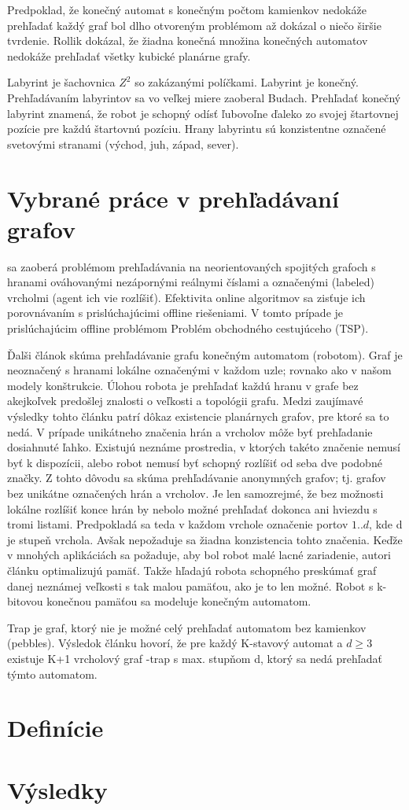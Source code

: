 Predpoklad, že konečný automat s konečným počtom 
kamienkov nedokáže prehľadať každý graf bol dlho otvoreným problémom až
\cite{ROLL} dokázal o niečo širšie tvrdenie. Rollik \cite{ROLL} dokázal, 
že žiadna konečná množina konečných automatov nedokáže prehľadať všetky 
kubické planárne grafy.

Labyrint je šachovnica $Z^2$ so zakázanými políčkami. 
Labyrint je konečný. Prehľadávaním labyrintov sa vo veľkej miere zaoberal 
Budach.
Prehľadať konečný labyrint znamená, že robot je schopný odísť ľubovoľne 
ďaleko zo svojej štartovnej pozície pre každú štartovnú pozíciu. 
Hrany labyrintu sú konzistentne označené svetovými stranami (východ, juh, 
západ, sever).

\section{Vybrané práce v prehľadávaní grafov}
\cite{OGE} sa zaoberá problémom prehľadávania na neorientovaných 
spojitých grafoch s hranami ováhovanými nezápornými reálnymi číslami a 
označenými (labeled) vrcholmi (agent ich vie rozlíšiť).
Efektivita online algoritmov sa zisťuje ich porovnávaním s  prislúchajúcimi 
offline riešeniami. V tomto prípade je prislúchajúcim offline problémom
Problém obchodného cestujúceho (TSP).

Ďalši článok \cite{GEFA}
skúma prehľadávanie grafu konečným automatom (robotom). 
Graf je neoznačený s hranami lokálne označenými v každom uzle; rovnako ako v
našom modely konštrukcie.
Úlohou robota je prehľadať každú hranu v grafe bez akejkoľvek predošlej 
znalosti o veľkosti a topológii grafu. Medzi zaujímavé výsledky tohto článku 
patrí dôkaz existencie planárnych grafov, pre ktoré sa to nedá.
V prípade unikátneho značenia hrán a vrcholov môže byť prehľadanie 
dosiahnuté ľahko. Existujú neznáme prostredia, v ktorých takéto značenie 
nemusí byť k dispozícii, alebo robot nemusí byť schopný rozlíšiť od seba dve 
podobné značky. Z tohto dôvodu sa skúma prehľadávanie anonymných grafov; 
tj. grafov bez unikátne označených hrán a vrcholov.
Je len samozrejmé, že bez možnosti lokálne rozlíšiť konce hrán by nebolo možné 
prehľadať dokonca ani hviezdu s tromi listami.
Predpokladá sa teda v každom vrchole označenie portov $1 .. d$, kde d je 
stupeň vrchola. Avšak nepožaduje sa žiadna konzistencia tohto značenia. 
Keďže v mnohých aplikáciách sa požaduje, aby bol robot malé lacné zariadenie, 
autori článku optimalizujú pamäť. Takže hľadajú robota schopného preskúmať 
graf danej neznámej veľkosti s tak malou pamäťou, ako je to len možné. 
Robot s k-bitovou konečnou pamäťou sa modeluje konečným automatom. 




Trap je graf, ktorý nie je možné 
celý prehľadať automatom bez kamienkov (pebbles). Výsledok článku hovorí, 
že pre každý K-stavový automat a $d\geq 3$ existuje K+1 vrcholový graf -trap
s max. stupňom d, ktorý sa nedá prehľadať týmto automatom.
\section{Definície}
\section{Výsledky}